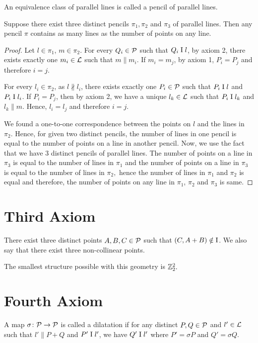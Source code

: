 \noindent
An equivalence class of parallel lines is called a pencil of parallel lines.

\begin{theorem} \label{thm:lines_num_pts}
    Suppose there exist three distinct pencils $\pi_1, \pi_2$ and $\pi_3$ of parallel lines. Then any pencil $\pi$ contains as many lines as the number of points on any line.
\end{theorem}
\begin{proof}
    Let $l \in \pi_1$, $m \in \pi_2$. For every $Q_i \in \mathcal{P}$ such that $Q_i \mathrel\text{I} l$, by axiom 2, there exists exactly one $m_i \in \mathcal{L}$ such that $m \parallel m_i.$ If $m_i = m_j$, by axiom 1, $P_i=P_j$ and therefore $i=j$.
    \vspace{1ex}

    \noindent
    For every $l_i \in \pi_2$, as $l \nparallel l_i$, there exists exactly one $P_i \in \mathcal{P}$ such that $P_i \mathrel\text{I} l$ and $P_i \mathrel\text{I} l_i$. If $P_i = P_j$, then by axiom 2, we have a unique $l_k \in \mathcal{L}$ such that $P_i \mathrel\text{I} l_k$ and $l_k \parallel m$. Hence, $l_i=l_j$ and therefore $i=j$.

    We found a one-to-one correspondence between the points on $l$ and the lines in $\pi_2.$ Hence, for given two distinct pencils, the number of lines in one pencil is equal to the number of points on a line in another pencil. Now, we use the fact that we have 3 distinct pencils of parallel lines. The number of points on a line in $\pi_3$ is equal to the number of lines in $\pi_1$ and the number of points on a line in $\pi_3$ is equal to the number of lines in $\pi_2,$ hence the number of lines in $\pi_1$ and $\pi_2$ is equal and therefore, the number of points on any line in $\pi_1$, $\pi_2$ and $\pi_3$ is same.
\end{proof}

\section{Third Axiom}
\begin{axiom}[3]
    There exist three distinct points $A,B,C \in \mathcal{P}$ such that $(C,A+B) \notin \text{I}$. We also say that there exist three non-collinear points.
\end{axiom}

\noindent
The smallest structure possible with this geometry is $\mathbb{Z}_2^2.$

\section{Fourth Axiom}
\begin{definition}
    A map $\sigma\colon \mathcal{P} \to \mathcal{P}$ is called a dilatation if for any distinct $P,Q \in \mathcal{P}$ and $l' \in \mathcal{L}$ such that $l' \parallel P+Q$ and $P' \mathrel\text{I} l'$, we have $Q' \mathrel\text{I} l'$ where $P'=\sigma P$ and $Q'=\sigma Q$.
\end{definition}


